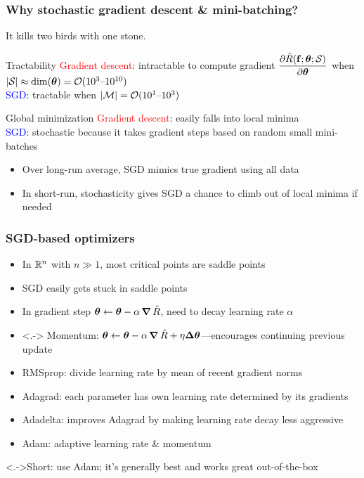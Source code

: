 \begin{frame}
    \frametitle{Why stochastic gradient descent \& mini-batching?}
    It kills two birds with one stone.

    \begin{block}{Tractability}
        \textcolor{red}{Gradient descent}: intractable to compute gradient $\dfrac{\partial \hat{R}(\mathbf{f}; \bm{\theta}; \mathcal{S})}{\partial \bm{\theta}}$ when $|\mathcal{S}| \approx \dim(\bm{\theta}) = \mathcal{O}(10^3 \text{--} 10^{10})$ \\[1ex]
        \textcolor{blue}{SGD}: tractable when $|\mathcal{M}| = \mathcal{O}(10^1 \text{--} 10^3)$
    \end{block}

    \begin{block}{Global minimization}
        \textcolor{red}{Gradient descent}: easily falls into local minima \\[1ex]
        \textcolor{blue}{SGD}: stochastic because it takes gradient steps based on random small mini-batches
        \begin{itemize}
            \item Over long-run average, SGD mimics true gradient using all data
            \item In short-run, stochasticity gives SGD a chance to climb out of local minima if needed
        \end{itemize}
    \end{block}
\end{frame}

\begin{frame}
    \frametitle{SGD-based optimizers}
    \begin{itemize}
        \item In $\mathbb{R}^n$ with $n \gg 1$, most critical points are saddle points
        \item SGD easily gets stuck in saddle points
        \item In gradient step $\bm{\theta} \leftarrow \bm{\theta} - \alpha \operatorname{\bm{\nabla}}\hat{R}$, need to decay learning rate $\alpha$
    \end{itemize}

    \begin{itemize}[<+->]
        \item<.-> Momentum: $\bm{\theta} \leftarrow \bm{\theta} - \alpha \operatorname{\bm{\nabla}}\hat{R} + \eta \mathbf{\Delta}\bm{\theta}$---encourages continuing previous update \citep{RumelhartNature86}
        \item RMSprop: divide learning rate by mean of recent gradient norms \citep{TielemanRMSProp}
        \item Adagrad: each parameter has own learning rate determined by its gradients \citep{DuchJMLR11}
        \item Adadelta: improves Adagrad by making learning rate decay less aggressive \citep{Zeiler12}
        \item \alert<+->{Adam}: adaptive learning rate \& momentum \citep{KingmaICLR15}
    \end{itemize}

    \uncover<.->{Short: use Adam; it's generally best and works great out-of-the-box}
\end{frame}

